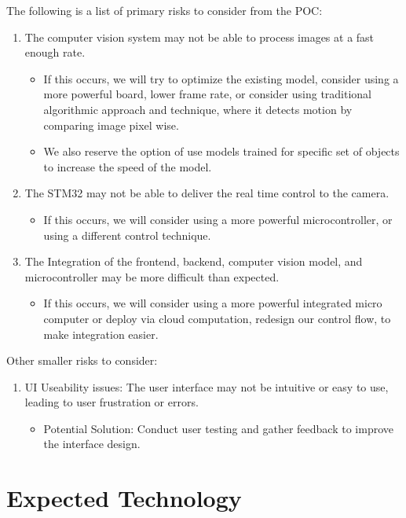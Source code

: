 \documentclass{article}
\begin{document}
The following is a list of primary risks to consider from the POC:
\begin{enumerate}
  \item The computer vision system may not be able to process images at a fast enough rate.
    \begin{itemize}
      \item If this occurs, we will try to optimize the existing model, consider using a more powerful board, lower frame rate, or consider using traditional algorithmic approach and technique, where it detects motion by comparing image pixel wise.
      \item We also reserve the option of use models trained for specific set of objects to increase the speed of the model.
    \end{itemize}
  \item The STM32 may not be able to deliver the real time control to the camera.
    \begin{itemize}
      \item If this occurs, we will consider using a more powerful microcontroller, or using a different control technique.
    \end{itemize}
  \item The Integration of the frontend, backend, computer vision model, and microcontroller may be more difficult than expected.
    \begin{itemize}
      \item If this occurs, we will consider using a more powerful integrated micro computer or deploy via cloud computation, redesign our control flow, to make integration easier.
    \end{itemize}
\end{enumerate}

Other smaller risks to consider:
\begin{enumerate}
  \item UI Useability issues: The user interface may not be intuitive or easy to use, leading to user frustration or errors.
    \begin{itemize}
      \item {Potential Solution}: Conduct user testing and gather feedback to improve the interface design.
    \end{itemize}
\end{enumerate}


\section{Expected Technology}
\end{document}
